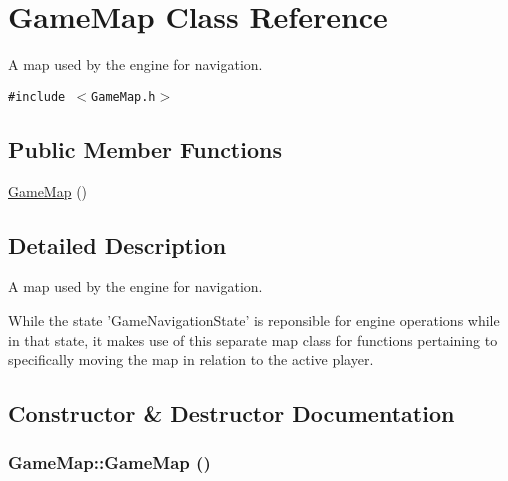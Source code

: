 \hypertarget{class_game_map}{
\section{GameMap Class Reference}
\label{class_game_map}
}
A map used by the engine for navigation.  


{\tt \#include $<$GameMap.h$>$}

\subsection*{Public Member Functions}
\begin{CompactItemize}
\item 
\hyperlink{class_game_map_ae71e5694cf19612fcaa4c1e21b03b71}{GameMap} ()
\end{CompactItemize}


\subsection{Detailed Description}
A map used by the engine for navigation. 

While the state 'GameNavigationState' is reponsible for engine operations while in that state, it makes use of this separate map class for functions pertaining to specifically moving the map in relation to the active player. 

\subsection{Constructor \& Destructor Documentation}
\hypertarget{class_game_map_ae71e5694cf19612fcaa4c1e21b03b71}{
\subsubsection[{GameMap}]{\setlength{\rightskip}{0pt plus 5cm}GameMap::GameMap ()}}
\label{class_game_map_ae71e5694cf19612fcaa4c1e21b03b71}


